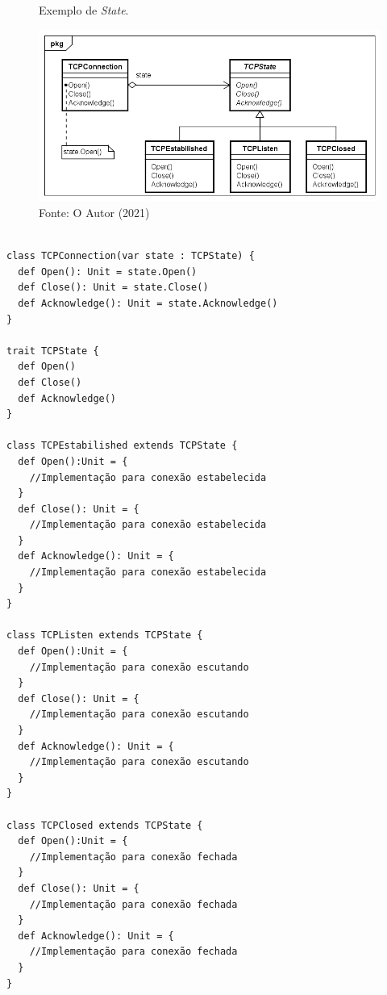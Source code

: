 \begin{figure}[htb]
	\caption{\label{state_exemplo}Exemplo de \textit{State}.}
	\begin{center}
	    \includegraphics[scale=0.5]{5_padroes-contexto-funcional/5.3_comportamentais/5.3.08_state/state_exemplo.png}
	\end{center}
  \caption*{Fonte: O Autor (2021)}
\end{figure}

\begin{lstlisting}[caption={\textit{State} Orientação a Objetos.},label=oostate]

class TCPConnection(var state : TCPState) {
  def Open(): Unit = state.Open()
  def Close(): Unit = state.Close()
  def Acknowledge(): Unit = state.Acknowledge()
}

trait TCPState {
  def Open()
  def Close()
  def Acknowledge()
}

class TCPEstabilished extends TCPState {
  def Open():Unit = {
    //Implementação para conexão estabelecida
  }
  def Close(): Unit = {
    //Implementação para conexão estabelecida
  }
  def Acknowledge(): Unit = {
    //Implementação para conexão estabelecida
  }
}

class TCPListen extends TCPState {
  def Open():Unit = {
    //Implementação para conexão escutando
  }
  def Close(): Unit = {
    //Implementação para conexão escutando
  }
  def Acknowledge(): Unit = {
    //Implementação para conexão escutando
  }
}

class TCPClosed extends TCPState {
  def Open():Unit = {
    //Implementação para conexão fechada
  }
  def Close(): Unit = {
    //Implementação para conexão fechada
  }
  def Acknowledge(): Unit = {
    //Implementação para conexão fechada
  }
}

\end{lstlisting}

